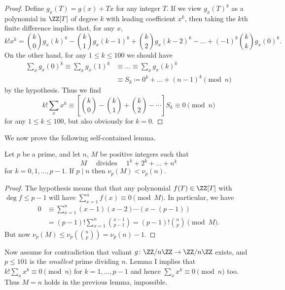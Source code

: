\begin{proof}
  Define $g_x(T) = g(x) + Tx$ for any integer $T$.
  If we view $g_x(T)^k$
  as a polynomial in $\ZZ[T]$ of degree $k$
  with leading coefficient $x^k$,
  then taking the $k$th finite difference implies that,
  for any $x$,
  \[ k! x^k = \binom k0 g_x(k)^k
    - \binom k1 g_x(k-1)^k  + \binom k2 g_x(k-2)^k - \dots
    + (-1)^k \binom kk g_x(0)^k.  \]
  On the other hand, for any $1 \le k \le 100$
  we should have
  \begin{align*}
    \sum_x g_x(0)^k \equiv \sum_x g_x(1)^k
    &\equiv \dots \equiv \sum_x g_x(k)^k \\
    &\equiv S_k \coloneqq 0^k + \dots + (n-1)^k \pmod n
  \end{align*}
  by the hypothesis.
  Thus we find
  \[ k! \sum_x x^k
    \equiv \left[ \binom k0 - \binom k1 + \binom k2 - \dotsb \right] S_k
    \equiv 0 \pmod n \]
  for any $1 \le k \le 100$, but also obviously for $k = 0$.
\end{proof}

We now prove the following self-contained lemma.
\begin{lemma*}
  Let $p$ be a prime, and let $n$, $M$ be positive integers such that
  \[ M \quad\text{ divides }\quad 1^k + 2^k + \dots + n^k \]
  for $k = 0, 1, \dots, p-1$.
  If $p \mid n$ then $\nu_p(M) < \nu_p(n)$.
\end{lemma*}

\begin{proof}
  The hypothesis means that
  that any polynomial $f(T) \in \ZZ[T]$
  with $\deg f \le p-1$ will have $\sum_{x=1}^n f(x) \equiv 0 \pmod{M}$.
  In particular, we have
  \begin{align*}
    0 &\equiv \sum_{x=1}^n (x-1)(x-2) \dotsm (x-(p-1)) \\
    &= (p-1)! \sum_{x=1}^{n} \binom{x-1}{p-1}
    = (p-1)! \binom np \pmod{M}.
  \end{align*}
  But now $\nu_p(M) \le \nu_p(\binom np) = \nu_p(n) - 1$.
\end{proof}

Now assume for contradiction that valiant
$g \colon \ZZ/n\ZZ \to \ZZ/n\ZZ$ exists,
and $p \le 101$ is the \emph{smallest} prime dividing $n$.
Lemma I implies that $k! \sum_x x^k \equiv 0 \pmod n$
for $k = 1, \dots, p-1$
and hence $\sum_x x^k \equiv 0 \pmod n$ too.
Thus $M = n$ holds in the previous lemma, impossible.

